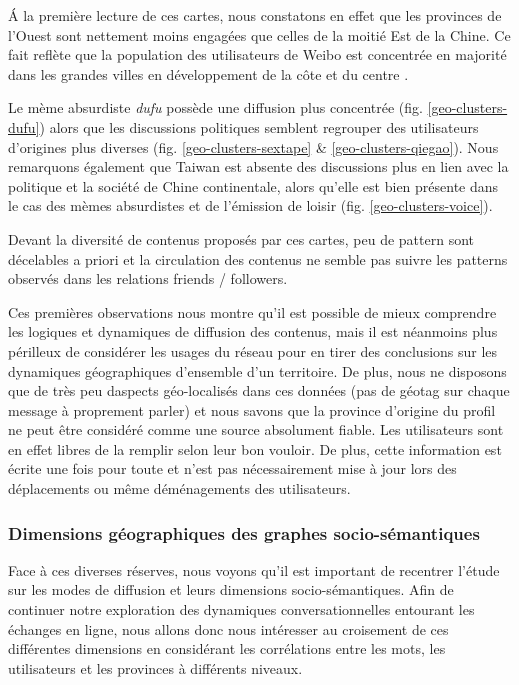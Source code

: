 \'A la premi\`ere lecture de ces cartes, nous constatons en effet que les provinces de l{\textquoteright}Ouest sont nettement moins engag\'ees que celles de la moiti\'e Est de la Chine. Ce fait refl\`ete que la population des utilisateurs de Weibo est concentr\'ee en majorit\'e dans les grandes villes en d\'eveloppement de la c\^ote et du centre \cite{Fu2013}.  

Le m\`eme absurdiste \textit{dufu} poss\`ede une diffusion plus concentr\'ee (fig. \ref{geo-clusters-dufu}) alors que les discussions politiques semblent regrouper des utilisateurs d{\textquoteright}origines plus diverses (fig. \ref{geo-clusters-sextape} \& \ref{geo-clusters-qiegao}). Nous remarquons \'egalement que Taiwan est absente des discussions plus en lien avec la politique et la soci\'et\'e de Chine continentale, alors qu{\textquoteright}elle est bien pr\'esente dans le cas des m\`emes absurdistes et de l{\textquoteright}\'emission de loisir (fig. \ref{geo-clusters-voice}).  

Devant la diversit\'e de contenus propos\'es par ces cartes, peu de pattern sont d\'ecelables a priori et la circulation des contenus ne semble pas suivre les patterns observ\'es dans les relations friends / followers. 

Ces premi\`eres observations nous montre qu{\textquoteright}il est possible de mieux comprendre les logiques et dynamiques de diffusion des contenus, mais il est n\'eanmoins plus p\'erilleux de consid\'erer les usages du r\'eseau pour en tirer des conclusions sur les dynamiques g\'eographiques d{\textquoteright}ensemble d{\textquoteright}un territoire. De plus, nous ne disposons que de tr\`es peu d{\textquotesingle}aspects {\textquotedbl}g\'eo-localis\'es{\textquotedbl} dans ces donn\'ees (pas de g\'eotag sur chaque message \`a proprement parler) et nous savons que la province d{\textquoteright}origine du profil ne peut \^etre consid\'er\'e comme une source absolument fiable. Les utilisateurs sont en effet libres de la remplir selon leur bon vouloir. De plus, cette information est \'ecrite une fois pour toute et n{\textquoteright}est pas n\'ecessairement mise \`a jour lors des d\'eplacements ou m\^eme d\'em\'enagements des utilisateurs. 

\subsubsection{Dimensions g\'eographiques des graphes socio-s\'emantiques}

Face \`a ces diverses r\'eserves, nous voyons qu{\textquoteright}il est important de recentrer l{\textquoteright}\'etude sur les modes de diffusion et leurs dimensions socio-s\'emantiques. Afin de continuer notre exploration des dynamiques conversationnelles entourant les \'echanges en ligne, nous allons donc nous int\'eresser au croisement de ces diff\'erentes dimensions en consid\'erant les corr\'elations entre les mots, les utilisateurs et les provinces \`a diff\'erents niveaux. 

